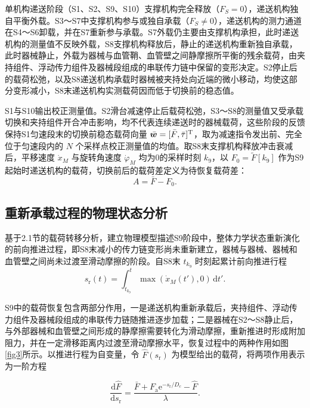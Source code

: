 \documentclass{JQR_LaTeX_Template-0507/JQRnewSubmission}
\begin{document}
单机构递送阶段（S1、S2、S9、S10）支撑机构完全释放（$F_S=0$），递送机构独自平衡外载。S3～S7中支撑机构参与或独自承载（$F_S\neq0$），递送机构的测力通道在S4～S6卸载，并在S7重新参与承载。S7外载仍主要由支撑机构承担，此时递送机构的测量值不反映外载，S8支撑机构释放后，静止的递送机构重新独自承载，此时器械静止，外载为器械与血管鞘、血管壁之间静摩擦所平衡的残余载荷，由夹持组件、浮动传力组件及器械段组成的串联传力链中保留的变形决定。S2停止后的载荷松弛，以及S8递送机构承载时器械被夹持处向近端的微小移动，均使这部分变形减小，S8末递送机构实测载荷因而低于切换前的稳态值。

S1与S10输出校正测量值。S2滑台减速停止后载荷松弛，S3～S8的测量值又受承载切换和夹持组件开合冲击影响，均不代表连续递送时的器械载荷，这些阶段的反馈保持S1匀速段末的切换前稳态载荷向量 $\bar{\bm w}=[\bar F,\bar\tau]^{\rm T}$，取为减速指令发出前、完全位于匀速段内的 $N$ 个采样点校正测量值的均值。取S8末支撑机构释放冲击衰减后，平移速度 $\dot x_M$ 与旋转角速度 $\dot\varphi_M$ 均为0的采样时刻 $k_9$，以 $F_0=\tilde F[k_9]$ 作为S9起始时递送机构的载荷，切换前后的载荷差定义为待恢复载荷差：
\begin{equation}
	\label{eq:deficit}
	A=\bar F-F_0.
\end{equation}


\subsection{重新承载过程的物理状态分析}

基于2.1节的载荷转移分析，建立物理模型描述S9阶段中，整体力学状态重新演化的前向推进过程，即S8末减小的传力链变形尚未重新建立，器械与器械、器械和血管壁之间尚未过渡至滑动摩擦的阶段。自S8末 $t_{k_9}$ 时刻起累计前向推进行程
\begin{equation}
\label{eq:recovery-travel}
s_{\mathrm r}(t)=\int_{t_{k_9}}^{t}
\max\!\left(\dot x_M(t'),0\right)\,\mathrm dt'.
\end{equation}


S9中的载荷恢复包含两部分作用，一是递送机构重新承载后，夹持组件、浮动传力组件及器械段组成的串联传力链随推进逐步加载；二是器械在S2～S8静止后，与外部器械和血管壁之间形成的静摩擦需要转化为滑动摩擦，重新推进时形成附加阻力，并在一定滑移距离内过渡至滑动摩擦水平，恢复过程中的两种作用如图\ref{fig3}所示。以推进行程为自变量，令 $\hat F(s_{\mathrm r})$ 为模型给出的载荷，将两项作用表示为一阶方程

\begin{equation}
\label{eq:recovery-ode}
\frac{\mathrm d\hat F}{\mathrm ds_{\mathrm r}}
=\frac{\bar F+F_{\mathrm a}\mathrm e^{-s_{\mathrm r}/D_c}-\hat F}{\lambda}.
\end{equation}
\end{document}
